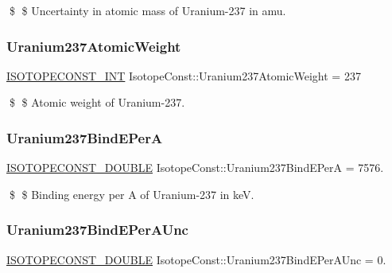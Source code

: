 \$ \$ Uncertainty in atomic mass of Uranium-\/237 in amu. \mbox{\label{group___isotope_const-_uranium-_u237_gab3147de8e175d4357651179d220d041f}} 
\subsubsection{\texorpdfstring{Uranium237\+Atomic\+Weight}{Uranium237AtomicWeight}}
{\footnotesize\ttfamily \mbox{\hyperlink{group___isotope_const-_macros_ga5f18360b3e99483a35c32d789e62621c}{I\+S\+O\+T\+O\+P\+E\+C\+O\+N\+S\+T\+\_\+\+I\+NT}} Isotope\+Const\+::\+Uranium237\+Atomic\+Weight = 237}

\$ \$ Atomic weight of Uranium-\/237. \mbox{\label{group___isotope_const-_uranium-_u237_ga7aa68aa568654283f3cebc7c36c90599}} 
\subsubsection{\texorpdfstring{Uranium237\+Bind\+E\+PerA}{Uranium237BindEPerA}}
{\footnotesize\ttfamily \mbox{\hyperlink{group___isotope_const-_macros_ga8f45a7272ce02c0b4c65c44636ed719a}{I\+S\+O\+T\+O\+P\+E\+C\+O\+N\+S\+T\+\_\+\+D\+O\+U\+B\+LE}} Isotope\+Const\+::\+Uranium237\+Bind\+E\+PerA = 7576.}

\$ \$ Binding energy per A of Uranium-\/237 in keV. \mbox{\label{group___isotope_const-_uranium-_u237_gab80bff8bc391d19a50c5b718865a995a}} 
\subsubsection{\texorpdfstring{Uranium237\+Bind\+E\+Per\+A\+Unc}{Uranium237BindEPerAUnc}}
{\footnotesize\ttfamily \mbox{\hyperlink{group___isotope_const-_macros_ga8f45a7272ce02c0b4c65c44636ed719a}{I\+S\+O\+T\+O\+P\+E\+C\+O\+N\+S\+T\+\_\+\+D\+O\+U\+B\+LE}} Isotope\+Const\+::\+Uranium237\+Bind\+E\+Per\+A\+Unc = 0.}

